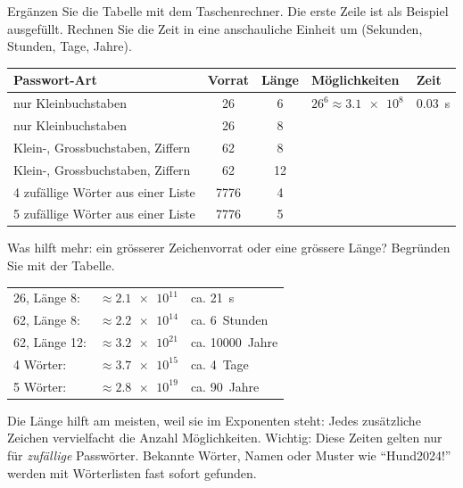 \begin{myexercise}\label{ex:passwort_rechnen}
	Ergänzen Sie die Tabelle mit dem Taschenrechner. Die erste Zeile ist als Beispiel ausgefüllt.
	Rechnen Sie die Zeit in eine anschauliche Einheit um (Sekunden, Stunden, Tage, Jahre).

	\begin{center}
		\renewcommand{\arraystretch}{1.6}
		\begin{tabular}{p{4.4cm}ccp{2.4cm}p{2.6cm}}
			\textbf{Passwort-Art}             & \textbf{Vorrat} & \textbf{Länge} & \textbf{Möglichkeiten}  & \textbf{Zeit}         \\
			\midrule
			nur Kleinbuchstaben               & 26              & 6              & $26^6 \approx \num{3.1e8}$ & \num{0.03}~s        \\
			nur Kleinbuchstaben               & 26              & 8              &                         &                       \\
			Klein-, Grossbuchstaben, Ziffern  & 62              & 8              &                         &                       \\
			Klein-, Grossbuchstaben, Ziffern  & 62              & 12             &                         &                       \\
			4 zufällige Wörter aus einer Liste & 7776           & 4              &                         &                       \\
			5 zufällige Wörter aus einer Liste & 7776           & 5              &                         &                       \\
		\end{tabular}
	\end{center}

	Was hilft mehr: ein grösserer Zeichenvorrat oder eine grössere Länge? Begründen Sie mit der Tabelle.
	\schreibzeile

	\begin{myanswer}
		\begin{tabular}{lll}
			26, Länge 8:   & $\approx \num{2.1e11}$ & ca. 21~s               \\
			62, Länge 8:   & $\approx \num{2.2e14}$ & ca. 6~Stunden           \\
			62, Länge 12:  & $\approx \num{3.2e21}$ & ca. \num{10000}~Jahre   \\
			4 Wörter:      & $\approx \num{3.7e15}$ & ca. 4~Tage              \\
			5 Wörter:      & $\approx \num{2.8e19}$ & ca. 90~Jahre            \\
		\end{tabular}

		Die Länge hilft am meisten, weil sie im Exponenten steht: Jedes zusätzliche Zeichen vervielfacht die Anzahl Möglichkeiten.
		Wichtig: Diese Zeiten gelten nur für \emph{zufällige} Passwörter. Bekannte Wörter, Namen oder Muster wie \enquote{Hund2024!} werden mit Wörterlisten fast sofort gefunden.
	\end{myanswer}
\end{myexercise}

